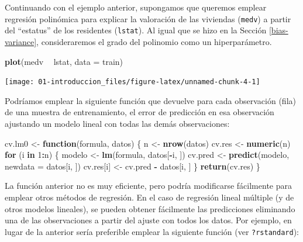 \documentclass[]{book}
\newenvironment{Shaded}{\begin{snugshade}}{\end{snugshade}}
\newcommand{\KeywordTok}[1]{\textcolor[rgb]{0.13,0.29,0.53}{\textbf{#1}}}
\newcommand{\DataTypeTok}[1]{\textcolor[rgb]{0.13,0.29,0.53}{#1}}
\newcommand{\DecValTok}[1]{\textcolor[rgb]{0.00,0.00,0.81}{#1}}
\newcommand{\StringTok}[1]{\textcolor[rgb]{0.31,0.60,0.02}{#1}}
\newcommand{\ControlFlowTok}[1]{\textcolor[rgb]{0.13,0.29,0.53}{\textbf{#1}}}
\newcommand{\OperatorTok}[1]{\textcolor[rgb]{0.81,0.36,0.00}{\textbf{#1}}}
\newcommand{\NormalTok}[1]{#1}
\theoremstyle{break}
\theoremstyle{definition}
\theoremstyle{definition}
\theoremstyle{definition}
\theoremstyle{remark}
\begin{document}
Continuando con el ejemplo anterior, supongamos que queremos emplear
regresión polinómica para explicar la valoración de las viviendas
(\texttt{medv}) a partir del ``estatus'' de los residentes
(\texttt{lstat}). Al igual que se hizo en la Sección
\ref{bias-variance}, consideraremos el grado del polinomio como un
hiperparámetro.

\begin{Shaded}
\begin{Highlighting}[]
\KeywordTok{plot}\NormalTok{(medv }\OperatorTok{~}\StringTok{ }\NormalTok{lstat, }\DataTypeTok{data =}\NormalTok{ train)}
\end{Highlighting}
\end{Shaded}

\begin{center}\texttt{[image: 01-introduccion\_files/figure-latex/unnamed-chunk-4-1]} \end{center}

Podríamos emplear la siguiente función que devuelve para cada
observación (fila) de una muestra de entrenamiento, el error de
predicción en esa observación ajustando un modelo lineal con todas las
demás observaciones:

\begin{Shaded}
\begin{Highlighting}[]
\NormalTok{cv.lm0 <-}\StringTok{ }\ControlFlowTok{function}\NormalTok{(formula, datos) \{}
\NormalTok{    n <-}\StringTok{ }\KeywordTok{nrow}\NormalTok{(datos)}
\NormalTok{    cv.res <-}\StringTok{ }\KeywordTok{numeric}\NormalTok{(n)}
    \ControlFlowTok{for}\NormalTok{ (i }\ControlFlowTok{in} \DecValTok{1}\OperatorTok{:}\NormalTok{n) \{}
\NormalTok{        modelo <-}\StringTok{ }\KeywordTok{lm}\NormalTok{(formula, datos[}\OperatorTok{-}\NormalTok{i, ])}
\NormalTok{        cv.pred <-}\StringTok{ }\KeywordTok{predict}\NormalTok{(modelo, }\DataTypeTok{newdata =}\NormalTok{ datos[i, ])}
\NormalTok{        cv.res[i] <-}\StringTok{ }\NormalTok{cv.pred }\OperatorTok{-}\StringTok{ }\NormalTok{datos[i, ]}
\NormalTok{    \}}
    \KeywordTok{return}\NormalTok{(cv.res)}
\NormalTok{\}}
\end{Highlighting}
\end{Shaded}

La función anterior no es muy eficiente, pero podría modificarse
fácilmente para emplear otros métodos de regresión. En el caso de
regresión lineal múltiple (y de otros modelos lineales), se pueden
obtener fácilmente las predicciones eliminando una de las observaciones
a partir del ajuste con todos los datos. Por ejemplo, en lugar de la
anterior sería preferible emplear la siguiente función (ver
\texttt{?rstandard}):
\end{document}
